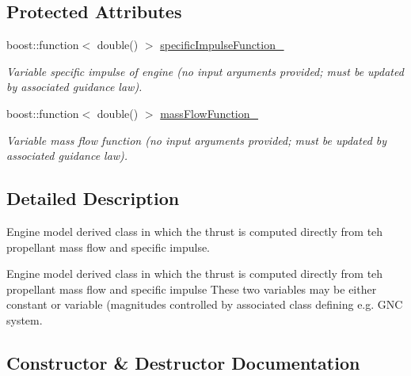 \subsection*{Protected Attributes}
\begin{DoxyCompactItemize}
\item 
boost\+::function$<$ double() $>$ \hyperlink{classtudat_1_1system__models_1_1DirectEngineModel_a84a44a5662e8544f516b3ed8b95a446a}{specific\+Impulse\+Function\+\_\+}\hypertarget{classtudat_1_1system__models_1_1DirectEngineModel_a84a44a5662e8544f516b3ed8b95a446a}{}\label{classtudat_1_1system__models_1_1DirectEngineModel_a84a44a5662e8544f516b3ed8b95a446a}

\begin{DoxyCompactList}\small\item\em Variable specific impulse of engine (no input arguments provided; must be updated by associated guidance law). \end{DoxyCompactList}\item 
boost\+::function$<$ double() $>$ \hyperlink{classtudat_1_1system__models_1_1DirectEngineModel_acb8424229dfbf9ab8ad95970ef51e965}{mass\+Flow\+Function\+\_\+}\hypertarget{classtudat_1_1system__models_1_1DirectEngineModel_acb8424229dfbf9ab8ad95970ef51e965}{}\label{classtudat_1_1system__models_1_1DirectEngineModel_acb8424229dfbf9ab8ad95970ef51e965}

\begin{DoxyCompactList}\small\item\em Variable mass flow function (no input arguments provided; must be updated by associated guidance law). \end{DoxyCompactList}\end{DoxyCompactItemize}


\subsection{Detailed Description}
Engine model derived class in which the thrust is computed directly from teh propellant mass flow and specific impulse. 

Engine model derived class in which the thrust is computed directly from teh propellant mass flow and specific impulse These two variables may be either constant or variable (magnitudes controlled by associated class defining e.\+g. G\+NC system. 

\subsection{Constructor \& Destructor Documentation}
